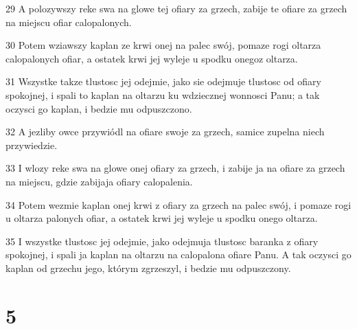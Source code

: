 \par 29 A polozywszy reke swa na glowe tej ofiary za grzech, zabije te ofiare za grzech na miejscu ofiar calopalonych.
\par 30 Potem wziawszy kaplan ze krwi onej na palec swój, pomaze rogi oltarza calopalonych ofiar, a ostatek krwi jej wyleje u spodku onegoz oltarza.
\par 31 Wszystke takze tlustosc jej odejmie, jako sie odejmuje tlustosc od ofiary spokojnej, i spali to kaplan na oltarzu ku wdziecznej wonnosci Panu; a tak oczysci go kaplan, i bedzie mu odpuszczono.
\par 32 A jezliby owce przywiódl na ofiare swoje za grzech, samice zupelna niech przywiedzie.
\par 33 I wlozy reke swa na glowe onej ofiary za grzech, i zabije ja na ofiare za grzech na miejscu, gdzie zabijaja ofiary calopalenia.
\par 34 Potem wezmie kaplan onej krwi z ofiary za grzech na palec swój, i pomaze rogi u oltarza palonych ofiar, a ostatek krwi jej wyleje u spodku onego oltarza.
\par 35 I wszystke tlustosc jej odejmie, jako odejmuja tlustosc baranka z ofiary spokojnej, i spali ja kaplan na oltarzu na calopalona ofiare Panu. A tak oczysci go kaplan od grzechu jego, którym zgrzeszyl, i bedzie mu odpuszczony.

\chapter{5}

